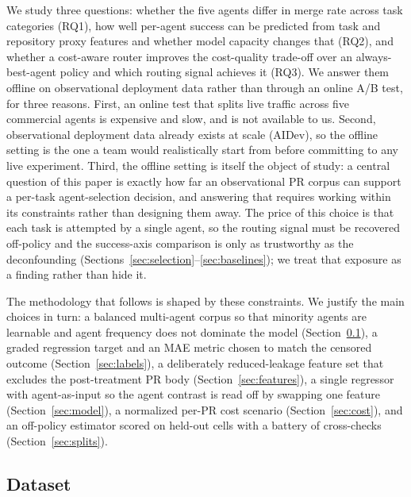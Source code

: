 \documentclass[sigconf,nonacm]{acmart}
\begin{document}
We study three questions: whether the five agents differ in merge rate across task categories (RQ1), how well per-agent success can be predicted from task and repository proxy features and whether model capacity changes that (RQ2), and whether a cost-aware router improves the cost-quality trade-off over an always-best-agent policy and which routing signal achieves it (RQ3). We answer them offline on observational deployment data rather than through an online A/B test, for three reasons. First, an online test that splits live traffic across five commercial agents is expensive and slow, and is not available to us. Second, observational deployment data already exists at scale (AIDev), so the offline setting is the one a team would realistically start from before committing to any live experiment. Third, the offline setting is itself the object of study: a central question of this paper is exactly how far an observational PR corpus can support a per-task agent-selection decision, and answering that requires working within its constraints rather than designing them away. The price of this choice is that each task is attempted by a single agent, so the routing signal must be recovered off-policy and the success-axis comparison is only as trustworthy as the deconfounding (Sections~\ref{sec:selection}--\ref{sec:baselines}); we treat that exposure as a finding rather than hide it.

The methodology that follows is shaped by these constraints. We justify the main choices in turn: a balanced multi-agent corpus so that minority agents are learnable and agent frequency does not dominate the model (Section~\ref{sec:dataset}), a graded regression target and an MAE metric chosen to match the censored outcome (Section~\ref{sec:labels}), a deliberately reduced-leakage feature set that excludes the post-treatment PR body (Section~\ref{sec:features}), a single regressor with agent-as-input so the agent contrast is read off by swapping one feature (Section~\ref{sec:model}), a normalized per-PR cost scenario (Section~\ref{sec:cost}), and an off-policy estimator scored on held-out cells with a battery of cross-checks (Section~\ref{sec:splits}).

\subsection{Dataset}\label{sec:dataset}
\end{document}
